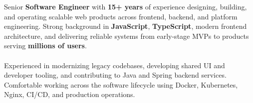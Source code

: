 
\begin{minipage}[t]{0.5\textwidth}
    \vspace{-6pt}

    Senior \textbf{Software Engineer} with \textbf{15+ years} of experience designing, building, and operating scalable web products across frontend, backend, and platform engineering. Strong background in \textbf{JavaScript}, \textbf{TypeScript}, modern frontend architecture, and delivering reliable systems from early-stage MVPs to products serving \textbf{millions of users}.
    \\
    \\
    Experienced in modernizing legacy codebases, developing shared UI and developer tooling, and contributing to Java and Spring backend services. Comfortable working across the software lifecycle using Docker, Kubernetes, Nginx, CI/CD, and production operations.

\end{minipage}
\hfill %
